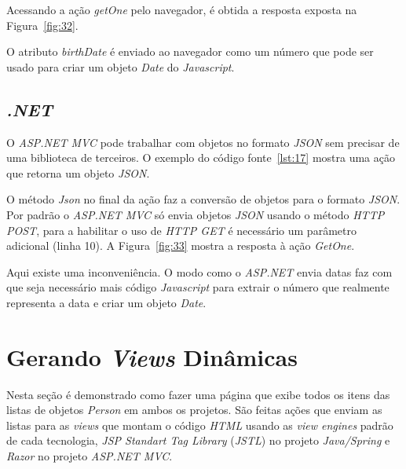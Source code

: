 
Acessando a ação \textit{getOne} pelo navegador, é obtida a resposta exposta na Figura~\ref{fig:32}.


O atributo \textit{birthDate} é enviado ao navegador como um número que pode ser usado para criar um objeto \textit{Date} do \textit{Javascript}.

\subsection{\textit{.NET}}

O \textit{ASP.NET MVC} pode trabalhar com objetos no formato \textit{JSON} sem precisar de uma biblioteca de terceiros. O exemplo do código fonte~\ref{lst:17} mostra uma ação que retorna um objeto \textit{JSON}.


O método \textit{Json} no final da ação faz a conversão de objetos para o formato \textit{JSON}. Por padrão o \textit{ASP.NET MVC} só envia objetos \textit{JSON} usando o método \textit{HTTP POST}, para a habilitar o uso de \textit{HTTP GET} é necessário um parâmetro adicional (linha 10). A Figura~\ref{fig:33} mostra a resposta à ação \textit{GetOne}.


Aqui existe uma inconveniência. O modo como o \textit{ASP.NET} envia datas faz com que seja necessário mais código \textit{Javascript} para extrair o número que realmente representa a data e criar um objeto \textit{Date}.

\section{Gerando \textit{Views} Dinâmicas}

Nesta seção é demonstrado como fazer uma página que exibe todos os itens das listas de objetos \textit{Person} em ambos os projetos. São feitas ações que enviam as listas para as \textit{views} que montam o código \textit{HTML} usando as \textit{view engines} padrão de cada tecnologia, \textit{JSP Standart Tag Library} (\textit{JSTL}) no projeto \textit{Java/Spring} e \textit{Razor} no projeto \textit{ASP.NET MVC}.

